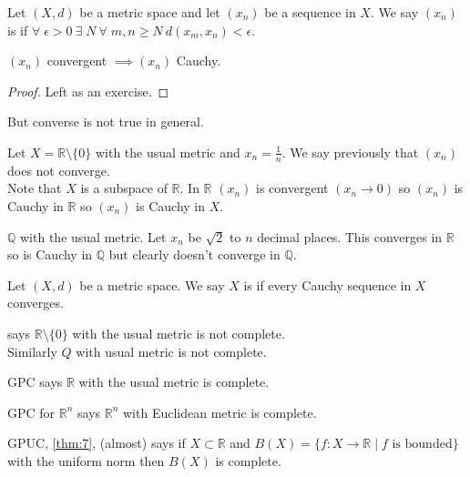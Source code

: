 \begin{definition}
    Let $(X, d)$ be a metric space and let $(x_n)$ be a sequence in $X$.
    We say $(x_n)$ is  if $\forall \; \epsilon > 0 \ \exists \; N \ \forall \; m, n \geq N \ d(x_m, x_n) < \epsilon$.
\end{definition} 

\begin{theorem}
    $(x_n)$ convergent $\implies (x_n)$ Cauchy.
\end{theorem} 
\begin{proof}
    Left as an exercise.
\end{proof} 

But converse is not true in general.

\begin{example} \label{exm:rnot0}
    Let $X = \mathbb{R} \setminus \{0\}$ with the usual metric and $x_n = \frac{1}{n}$.
    We say previously that $(x_n)$ does not converge. \\
    Note that $X$ is a subspace of $\mathbb{R}$.
    In $\mathbb{R}$ $(x_n)$ is convergent $(x_n \to 0)$ so $(x_n)$ is Cauchy in $\mathbb{R}$ so $(x_n)$ is Cauchy in $X$.
\end{example} 

\begin{example}
    $\mathbb{Q}$ with the usual metric.
    Let $x_n$ be $\sqrt{2}$ to $n$ decimal places.
    This converges in $\mathbb{R}$ so is Cauchy in $\mathbb{Q}$ but clearly doesn't converge in $\mathbb{Q}$.
\end{example} 

\begin{definition}[Completeness]
    Let $(X, d)$ be a metric space.
    We say $X$ is  if every Cauchy sequence in $X$ converges.
\end{definition} 

\begin{example}
     says $\mathbb{R} \setminus \{0\}$ with the usual metric is not complete. \\
    Similarly $Q$ with usual metric is not complete.
\end{example} 

\begin{example}
    GPC says $\mathbb{R}$ with the usual metric is complete.
\end{example} 

\begin{example}
    GPC for $\mathbb{R}^n$ says $\mathbb{R}^n$ with Euclidean metric is complete.
\end{example} 

\begin{example}
    GPUC, \cref{thm:7}, (almost) says if $X \subset \mathbb{R}$ and $B(X) = \{f : X \to \mathbb{R} \mid f \text{ is bounded}\}$ with the uniform norm then $B(X)$ is complete.
\end{example} 